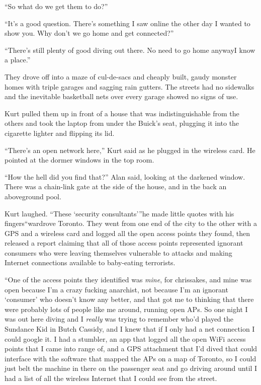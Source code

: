 ``So what do we get them to do?''

``It's a good question.  There's something I saw online the other day
I wanted to show you.  Why don't we go home and get connected?''

``There's still plenty of good diving out there.  No need to go home
anyway\dash{}I know a place.''

They drove off into a maze of cul-de-sacs and cheaply built, gaudy
monster homes with triple garages and sagging rain gutters.  The
streets had no sidewalks and the inevitable basketball nets over every
garage showed no signs of use.

Kurt pulled them up in front of a house that was indistinguishable
from the others and took the laptop from under the Buick's seat,
plugging it into the cigarette lighter and flipping its lid.

``There's an open network here,'' Kurt said as he plugged in the
wireless card.  He pointed at the dormer windows in the top room.

``How the hell did you find that?'' Alan said, looking at the darkened
window.  There was a chain-link gate at the side of the house, and in
the back an aboveground pool.

Kurt laughed.  ``These `security consultants'''\dash{}he made little quotes
with his fingers\dash{}``wardrove Toronto.  They went from one end of the
city to the other with a GPS and a wireless card and logged all the
open access points they found, then released a report claiming that
all of those access points represented ignorant consumers who were
leaving themselves vulnerable to attacks and making Internet
connections available to baby-eating terrorists.

``One of the access points they identified was \textit{mine}, for
chrissakes, and mine was open because I'm a crazy fucking anarchist,
not because I'm an ignorant `consumer' who doesn't know any better,
and that got me to thinking that there were probably lots of people
like me around, running open APs.  So one night I was out here diving
and I \textit{really} was trying to remember who'd played the Sundance
Kid in Butch Cassidy, and I knew that if I only had a net connection I
could google it.  I had a stumbler, an app that logged all the open
WiFi access points that I came into range of, and a GPS attachment
that I'd dived that could interface with the software that mapped the
APs on a map of Toronto, so I could just belt the machine in there on
the passenger seat and go driving around until I had a list of all the
wireless Internet that I could see from the street.

